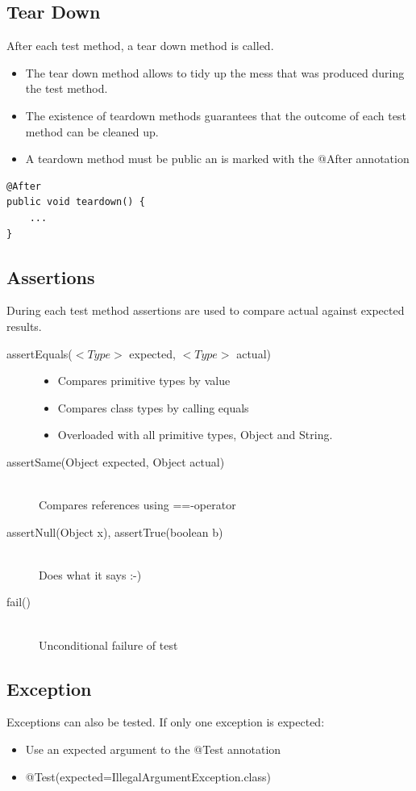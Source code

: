 \documentclass[a4paper,10pt]{article}
\begin{document}
\subsection{Tear Down}
After each test method, a tear down method is called.
\begin{itemize}
	\item The tear down method allows to tidy up the mess that was produced during the test method.
	\item The existence of teardown methods guarantees that the outcome of each test method can be cleaned up.
	\item A teardown method must be public an is marked with the @After annotation
\end{itemize}
\begin{lstlisting}
@After
public void teardown() {
	... 
}
\end{lstlisting}

\subsection{Assertions}
During each test method assertions are used to compare actual against expected results.
\begin{description}
	\item[assertEquals($<Type>$ expected, $<Type>$ actual)] \hfill
		\begin{itemize}
			\item Compares primitive types by value
			\item Compares class types by calling equals	
			\item Overloaded with all primitive types, Object and String.
		\end{itemize}
	\item[assertSame(Object expected, Object actual)] \hfill \\
		Compares references using ==-operator
	\item[assertNull(Object x), assertTrue(boolean b)] \hfill \\
		Does what it says :-)
	\item[fail()] \hfill \\
		Unconditional failure of test
\end{description}

\subsection{Exception}
Exceptions can also be tested. If only one exception is expected:
\begin{itemize}
	\item Use an expected argument to the @Test annotation
	\item @Test(expected=IllegalArgumentException.class)
\end{itemize}
\end{document}
